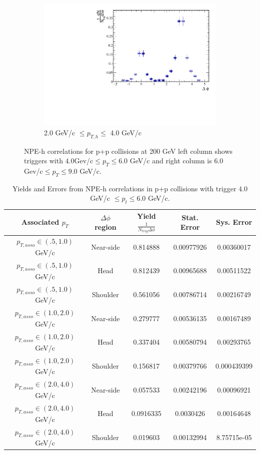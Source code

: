 \begin{figure}[htbp]
\begin{subfigure}{0.5\textwidth}
		\includegraphics[width=.9\textwidth]{Plots/Correlations/pp/pp_NPE_h_corr_primpt_6_8_assopt_3_4.pdf}
		\caption{2.0 GeV/c $\leq p_{T,h} \leq$ 4.0 GeV/c}
		\label{fig:ppcorrf}
	\end{subfigure}	
\caption[NPE-hadron correlations in p+p]{NPE-h correlations for p+p collisions at 200 GeV left column shows triggers with $4.0 $Gev/c$\leq p_{T} \leq 6.0$ GeV/c and right column is $6.0 $Gev/c$\leq p_{T} \leq 9.0$ GeV/c.}
\label{fig:ppcorr}
\end{figure}


\begin{table}
\centering
\begin{tabular}{|c|c|c|c|c|}
\hline
Associated $p_T$	& $\Delta\phi$ region & Yield $\frac{1}{N_{trig} \Delta\phi}$ & Stat. Error & Sys. Error\\
\hline
$p_{T,asso} \in(.5, 1.0)$ GeV/c  & Near-side  &  0.814888 & 0.00977926 & 0.00360017 \\
\hline
$p_{T,asso} \in(.5, 1.0)$ GeV/c  & Head  &  0.812439 & 0.00965688 & 0.00511522 \\
\hline
$p_{T,asso} \in(.5, 1.0)$ GeV/c  & Shoulder & 0.561056 & 0.00786714 & 0.00216749\\ 
\hline
$p_{T,asso} \in(1.0, 2.0)$ GeV/c  & Near-side & 0.279777 & 0.00536135 & 0.00167489 \\ 
\hline
$p_{T,asso} \in(1.0, 2.0)$ GeV/c  & Head & 0.337404 & 0.00580794 & 0.00293765 \\
\hline
$p_{T,asso} \in(1.0, 2.0)$ GeV/c  & Shoulder & 0.156817 & 0.00379766 & 0.000439399 \\ 
\hline
$p_{T,asso} \in(2.0, 4.0)$ GeV/c  & Near-side & 0.057533 & 0.00242196 & 0.00096921 \\
\hline
$p_{T,asso} \in(2.0, 4.0)$ GeV/c  & Head & 0.0916335 & 0.0030426 & 0.00164648 \\
\hline
$p_{T,asso} \in(2.0, 4.0)$ GeV/c  & Shoulder & 0.019603 & 0.00132994 & 8.75715e-05 \\
\hline
\end{tabular}
\caption[Yields and Errors in p+p Correlations, Low Trigger]{Yields and Errors from NPE-h correlations in p+p collisions with trigger $4.0 $GeV/c $\leq p_t \leq 6.0$ GeV/c.}
\label{tab:ppyieldlow}
\end{table} 

